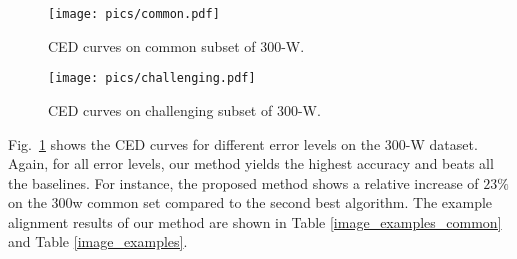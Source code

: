 \documentclass[journal]{IEEEtran}
\begin{document}
\begin{figure}
\centering
    \texttt{[image: pics/common.pdf]}
  \caption{CED curves on common subset of 300-W.}
  \label{ced_common}  %
\end{figure}

\begin{figure}
\centering
    \texttt{[image: pics/challenging.pdf]}
  \caption{CED curves on challenging subset of 300-W.}
  \label{ced_challenge}  %
\end{figure}
Fig.~\ref{ced_common} shows the CED curves for different error levels on the 300-W dataset. Again, for all error levels, our method yields the highest accuracy and beats all the baselines.
For instance, the proposed method shows a relative increase of $23\%$ on the 300w common set compared to the second best algorithm. The example alignment results of our method are shown in Table \ref{image_examples_common} and Table \ref{image_examples}.
\end{document}
